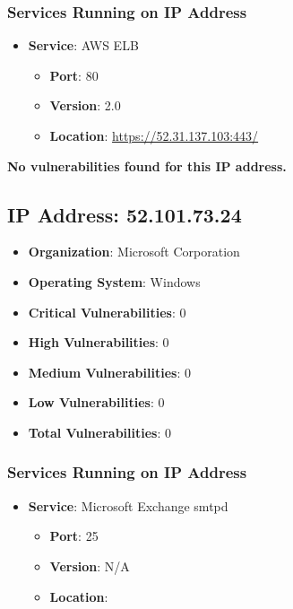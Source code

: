 \documentclass{article}
\begin{document}
\subsubsection*{Services Running on IP Address}

\begin{itemize}
    
        \item \textbf{Service}: AWS ELB
        \begin{itemize}
            \item \textbf{Port}: 80
            \item \textbf{Version}:  2.0 
            \item \textbf{Location}: \href{ https://52.31.137.103:443/ }{ https://52.31.137.103:443/ }
        \end{itemize}
    
\end{itemize}


\textbf{No vulnerabilities found for this IP address.}




\clearpage



\subsection{IP Address: 52.101.73.24}

\begin{itemize}
    \item \textbf{Organization}: Microsoft Corporation
    \item \textbf{Operating System}:  Windows 
    \item \textbf{Critical Vulnerabilities}: 0
    \item \textbf{High Vulnerabilities}: 0
    \item \textbf{Medium Vulnerabilities}: 0
    \item \textbf{Low Vulnerabilities}: 0
    \item \textbf{Total Vulnerabilities}: 0
\end{itemize}

\subsubsection*{Services Running on IP Address}

\begin{itemize}
    
        \item \textbf{Service}: Microsoft Exchange smtpd
        \begin{itemize}
            \item \textbf{Port}: 25
            \item \textbf{Version}:  N/A 
            \item \textbf{Location}: \href{  }{  }
        \end{itemize}
    
\end{itemize}
\end{document}
